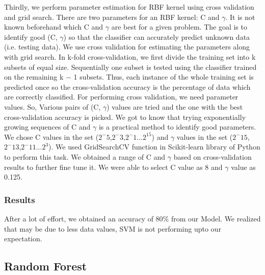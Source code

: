 Thirdly, we perform parameter estimation for RBF kernel using cross validation and grid search. There are two parameters for an RBF kernel: C and $\gamma$. It is not known beforehand
which C and $\gamma$ are best for a given problem. The goal is to identify good (C, $\gamma$) so that the classifier can accurately predict unknown data (i.e. testing data). We use cross validation for estimating the parameters along with grid search. In k-fold cross-validation, we first divide the training set into k subsets of equal size. Sequentially one subset is tested using the classifier trained on the remaining k − 1 subsets. Thus, each instance of the whole training set is predicted once so the cross-validation accuracy is the percentage of data which are correctly classified. For performing cross validation, we need parameter values. So, Various pairs of (C, $\gamma$) values are tried and the one with the best cross-validation accuracy is picked. We got to know that trying exponentially growing sequences of C and $\gamma$ is a practical method to identify good parameters. We chose C values in the set ($2^-5$,$2^-3$,$2^-1$...$2^15$) and $\gamma$ values in the set ($2^-15$,$2^-13$,$2^-11$...$2^3$). We used GridSearchCV function in Scikit-learn library of Python to perform this task. We obtained a range of C and $\gamma$ based on cross-validation results to further fine tune it. We were able to select C value as 8 and $\gamma$ value as 0.125.

\subsubsection{Results}
After a lot of effort, we obtained an accuracy of 80\% from our Model. We realized that may be due to less data values, SVM is not performing upto our expectation.

\subsection{Random Forest}

